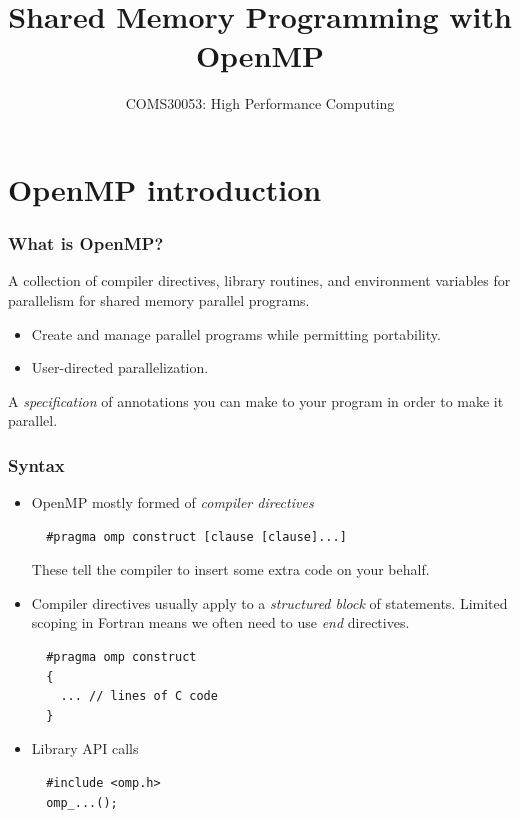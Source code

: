 \documentclass[aspectratio=169]{beamer}
\title{Shared Memory Programming with OpenMP}
\subtitle{COMS30053: High Performance Computing}
\begin{document}
\frame{\titlepage}

\section{OpenMP introduction}
\begin{frame}
\frametitle{What is OpenMP?}

A collection of compiler directives, library routines, and environment variables for parallelism for shared memory parallel programs.

\begin{itemize}
  \item Create and manage parallel programs while permitting portability.
  \item User-directed parallelization.
\end{itemize}

A \emph{specification} of annotations you can make to your program in order to make it parallel.

\end{frame}

\begin{frame}[fragile]
\frametitle{Syntax}
\begin{itemize}
\item OpenMP mostly formed of \emph{compiler directives}\\
  \begin{verbatim}
  #pragma omp construct [clause [clause]...]
  \end{verbatim}
  These tell the compiler to insert some extra code on your behalf.

\item Compiler directives usually apply to a \emph{structured block} of statements.
Limited scoping in Fortran means we often need to use \emph{end} directives.
  \begin{verbatim}
  #pragma omp construct
  {
    ... // lines of C code
  }
  \end{verbatim}

\item Library API calls
  \begin{verbatim}
  #include <omp.h>
  omp_...();
  \end{verbatim}

\end{itemize}
\end{frame}
\end{document}
